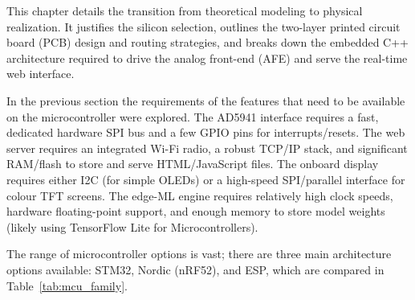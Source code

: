 
\label{chap:Detailed-Hardware-and-Software-Implementation}


This chapter details the transition from theoretical modeling to physical realization. It justifies the silicon selection, outlines the two-layer printed circuit board (PCB) design and routing strategies, and breaks down the embedded C++ architecture required to drive the analog front-end (AFE) and serve the real-time web interface.




\label{sec:choosing_mcu}

In the previous section the requirements of the features that need to be available on the microcontroller were explored. The AD5941 interface requires a fast, dedicated hardware SPI bus and a few GPIO pins for interrupts/resets. The web server requires an integrated Wi-Fi radio, a robust TCP/IP stack, and significant RAM/flash to store and serve HTML/JavaScript files. The onboard display requires either I2C (for simple OLEDs) or a high-speed SPI/parallel interface for colour TFT screens. The edge-\ac{ML} engine requires relatively high clock speeds, hardware floating-point support, and enough memory to store model weights (likely using TensorFlow Lite for Microcontrollers).

\label{sec:mcu_family}

The range of microcontroller options is vast; there are three main architecture options available: STM32, Nordic (nRF52), and ESP, which are compared in Table~\ref{tab:mcu_family}.

